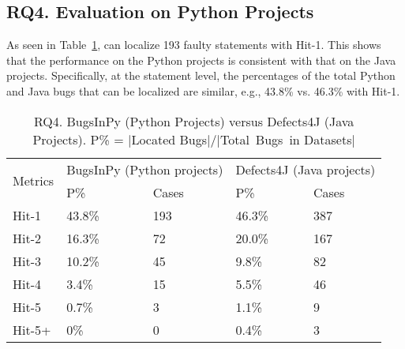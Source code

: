 \subsection{\bf RQ4. Evaluation on Python Projects}
As seen in Table~\ref{RQ4}, {\tool} can localize 193 faulty
statements with Hit-1. This shows that the
performance on the Python projects is consistent with that
on the Java projects. Specifically, at the statement level, the
percentages of the total Python and Java bugs that can be localized
are similar, e.g., 43.8\% vs. 46.3\% with Hit-1.



\begin{table}[t]
	\caption{RQ4. BugsInPy (Python Projects) versus Defects4J (Java Projects). P\% = $|$Located Bugs$|$/$|$Total~Bugs~in Datasets$|$}
	\vspace{-10pt}
	{\small
		\begin{center}
			\tabcolsep 2.7pt
			\begin{tabular}{p{1.4cm}<{\centering}|p{1.55cm}<{\centering}p{1.55cm}<{\centering}|p{1.55cm}<{\centering}p{1.55cm}<{\centering}}\hline\cline{2-5}	
				
		\multirow{2}{*}{Metrics}& \multicolumn{2}{c|}{BugsInPy (Python projects)} & \multicolumn{2}{c}{Defects4J (Java projects)}\\\cline{2-5}
				           & P\%& Cases &P\%& Cases \\ \hline
				
				Hit-1  &  43.8\%  &   193    & 46.3\%  &387\\ 
				\hline
				  
			    Hit-2  &  16.3\%  &   72   & 20.0\%  &167\\
				\hline
				
				 
				Hit-3  &  10.2\%  &  45     & 9.8\%  &82\\
				\hline
				
				Hit-4  &  3.4\%  &   15    & 5.5\%  &46\\
				\hline
				
				Hit-5  & 0.7\%   &   3    & 1.1\%  &9\\
				\hline
				
				Hit-5+ &  0\%  &   0    & 0.4\%  &3\\
				\hline
			\end{tabular}
			\label{RQ4}
		\end{center}
	}
\end{table}



